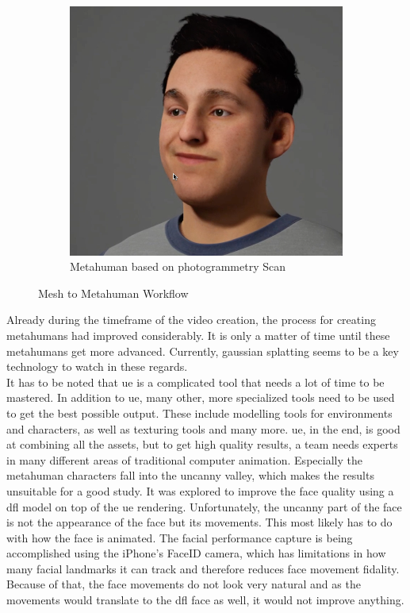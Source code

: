 \documentclass[
  a4paper,  %
  twoside,  %
  bibliography=totoc,
  headsepline,
  cleardoublepage=empty,
  parskip=half,
  draft=false
]{scrbook}
\begin{document}
\begin{figure}[h]
\begin{subfigure}[b]{0.5\textwidth}
    \includegraphics[width=\textwidth]{./graphics/Metahuman.png}
    \caption{Metahuman based on photogrammetry Scan}
    \label{fig:metahuman-result}
  \end{subfigure}
  \caption{Mesh to Metahuman Workflow}
  \label{fig:metahuman-comp}
\end{figure}

Already during the timeframe of the video creation, the process for creating metahumans had improved considerably. It is only a matter of time until these metahumans get more advanced. Currently, gaussian splatting seems to be a key technology to watch in these regards. \\
It has to be noted that \gls{ue} is a complicated tool that needs a lot of time to be mastered. In addition to \gls{ue}, many other, more specialized tools need to be used to get the best possible output. These include modelling tools for environments and characters, as well as texturing tools and many more. \gls{ue}, in the end, is good at combining all the assets, but to get high quality results, a team needs experts in many different areas of traditional computer animation. Especially the metahuman characters fall into the uncanny valley, which makes the results unsuitable for a good study. It was explored to improve the face quality using a \gls{dfl} model on top of the \gls{ue} rendering. Unfortunately, the uncanny part of the face is not the appearance of the face but its movements. This most likely has to do with how the face is animated. The facial performance capture is being accomplished using the iPhone's FaceID camera, which has limitations in how many facial landmarks it can track and therefore reduces face movement fidality. Because of that, the face movements do not look very natural and as the movements would translate to the \gls{dfl} face as well, it would not improve anything.
\end{document}
